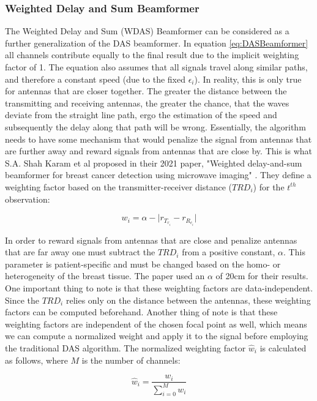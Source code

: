 \subsubsection{Weighted Delay and Sum Beamformer}
The Weighted Delay and Sum (WDAS) Beamformer can be considered as a further generalization of the DAS beamformer.
In equation \ref{eq:DASBeamformer} all channels contribute equally to the final result due to the implicit weighting
factor of 1. The equation also assumes that all signals travel along similar paths, and therefore a constant speed (due
to the fixed $\epsilon_i$). In reality, this is only true for antennas that are closer together. The greater the
distance between the transmitting and receiving antennas, the greater the chance, that the waves deviate from the straight line
path, ergo the estimation of the speed and subsequently the delay along that path will be wrong. Essentially, the
algorithm needs to have some mechanism that would penalize the signal from antennas that are further away and reward
signals from antennas that are close by. This is what S.A. Shah Karam et al proposed in their 2021 paper, "Weighted delay-and-sum beamformer for breast cancer detection using
microwave imaging" \cite{shahkaramWeightedDelayandsumBeamformer2021}. They define a weighting factor based on the
transmitter-receiver distance ($TRD_i$) for
the $t^{th}$ observation:

\begingroup
\large
\begin{equation}
    w_i = \alpha -  \lvert r_{T_{r_i}} - r_{R_{c_i}} \rvert
\end{equation}
\endgroup

In order to reward signals from antennas that are close and penalize antennas that are far away one must subtract the
$TRD_i$ from a positive constant, $\alpha$. This parameter is patient-specific and must be changed based on the homo- or
heterogeneity of the breast tissue. The paper used an $\alpha$ of 20cm for their results. One important thing to note is
that these weighting factors are data-independent. Since the $TRD_i$ relies only on the distance between the antennas,
these weighting factors can be computed beforehand. Another thing of note is that these weighting factors are
independent of the chosen focal point as well, which means we can compute a normalized weight and apply it to the signal
before employing the traditional DAS algorithm. The normalized weighting factor $\hat{w}_i$ is calculated as follows,
where $M$ is the number of channels:

\begingroup
\large
\begin{equation}
    \hat{w}_i = \frac{w_i}{\sum_{i=0}^{M} w_i}
\end{equation} 
\endgroup

